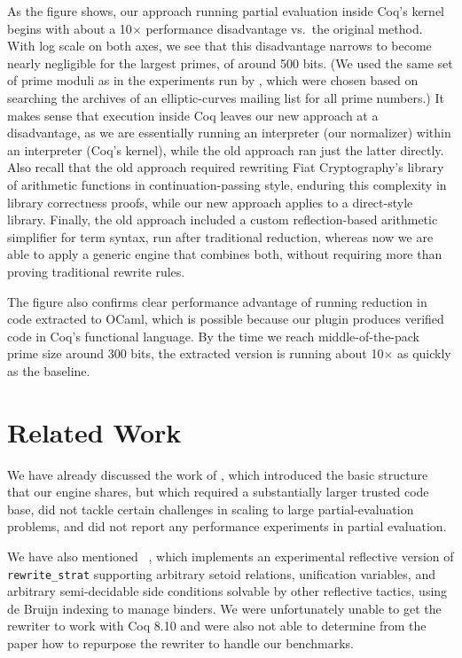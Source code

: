 As the figure shows, our approach running partial evaluation inside Coq's kernel begins with about a 10$\times$ performance disadvantage vs.\ the original method.
With log scale on both axes, we see that this disadvantage narrows to become nearly negligible for the largest primes, of around 500 bits.
(We used the same set of prime moduli as in the experiments run by \textcite{FiatCryptoSP19}, which were chosen based on searching the archives of an elliptic-curves mailing list for all prime numbers.)
It makes sense that execution inside Coq leaves our new approach at a disadvantage, as we are essentially running an interpreter (our normalizer) within an interpreter (Coq's kernel), while the old approach ran just the latter directly.
Also recall that the old approach required rewriting Fiat Cryptography's library of arithmetic functions in continuation-passing style, enduring this complexity in library correctness proofs, while our new approach applies to a direct-style library.
Finally, the old approach included a custom reflection-based arithmetic simplifier for term syntax, run after traditional reduction, whereas now we are able to apply a generic engine that combines both, without requiring more than proving traditional rewrite rules.

The figure also confirms clear performance advantage of running reduction in code extracted to OCaml, which is possible because our plugin produces verified code in Coq's functional language.
By the time we reach middle-of-the-pack prime size around 300 bits, the extracted version is running about 10$\times$ as quickly as the baseline.


\section{Related Work}\label{sec:related}

We have already discussed the work of \textcite{Aehlig}, which introduced the basic structure that our engine shares, but which required a substantially larger trusted code base, did not tackle certain challenges in scaling to large partial-evaluation problems, and did not report any performance experiments in partial evaluation.

We have also mentioned \Rtac{}~\cite{rtac}, which implements an experimental reflective version of \texttt{rewrite\_strat} supporting arbitrary setoid relations, unification variables, and arbitrary semi-decidable side conditions solvable by other reflective tactics, using de Bruijn indexing to manage binders.
We were unfortunately unable to get the rewriter to work with Coq 8.10 and were also not able to determine from the paper how to repurpose the rewriter to handle our benchmarks.

